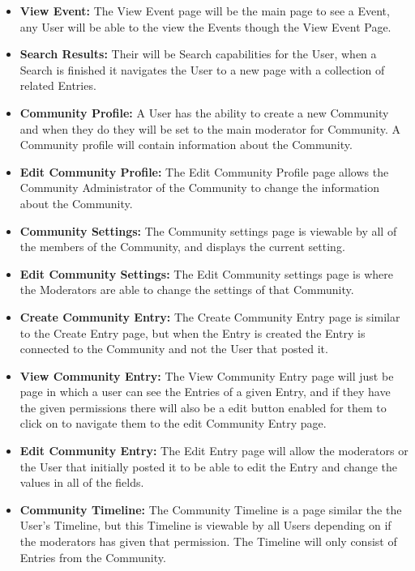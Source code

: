 \documentclass[letterpaper, 10, draftclsnofoot, onecolumn]{IEEEtran}
\begin{document}
\begin{itemize}
\item \textbf{View Event: } The View Event page will be the main page to see a Event, any User will be able to the view the Events though the View Event Page. 
\item \textbf{Search Results: } Their will be Search capabilities for the User, when a Search is finished it navigates the User to a new page with a collection of related Entries. 
\item \textbf{Community Profile: } A User has the ability to create a new Community and when they do they will be set to the main moderator for Community. A Community profile will contain information about the Community.
\item \textbf{Edit Community Profile: } The Edit Community Profile page allows the Community Administrator of the Community to change the information about the Community.
\item \textbf{Community Settings: } The Community settings page is viewable by all of the members of the Community, and displays the current setting.
\item \textbf{Edit Community Settings: } The Edit Community settings page is where the Moderators are able to change the settings of that Community.
\item \textbf{Create  Community Entry: } The Create Community Entry page is similar to the Create Entry page, but when the Entry is created the Entry is connected to the Community and not the User that posted it.
\item \textbf{View Community Entry: } The View Community Entry page will just be page in which a user can see the Entries of a given Entry, and if they have the given permissions there will also be a edit button enabled for them to click on to navigate them to the edit Community Entry page. 
\item \textbf{Edit Community Entry: } The Edit Entry page will allow the moderators or the User that initially posted it to be able to edit the Entry and change the values in all of the fields.
\item \textbf{Community Timeline: } The Community Timeline is a page similar the the User's Timeline, but this Timeline is viewable by all Users depending on if the moderators has given that permission. The Timeline will only consist of Entries from the Community.
\end{itemize}
\end{document}
